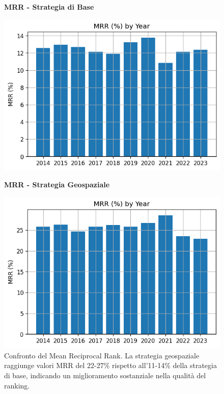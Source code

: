 \begin{figure}[htbp]
\centering
\begin{minipage}{0.48\textwidth}
\centering
\textbf{MRR - Strategia di Base}\par
\vspace{0.3em}
\includegraphics[width=\textwidth]{../../img/llama3.1_8b/no_SPACE-GEO_n-1_come_current_POI/mrr_distribution.png}
\end{minipage}
\hfill
\begin{minipage}{0.48\textwidth}
\centering
\textbf{MRR - Strategia Geospaziale}\par
\vspace{0.3em}
\includegraphics[width=\textwidth]{../../img/llama3.1_8b/SPACE-GEO_n-1_come_current_POI/MRR.png}
\end{minipage}
\caption{Confronto del Mean Reciprocal Rank. La strategia geospaziale raggiunge valori MRR del 22-27\% rispetto all'11-14\% della strategia di base, indicando un miglioramento sostanziale nella qualità del ranking.}
\label{fig:mrr_comparison}
\end{figure}

